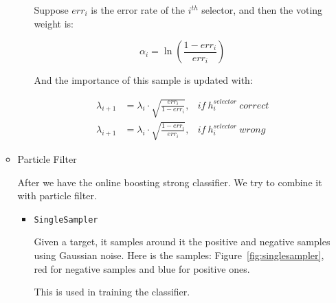 \documentclass[a4paper]{article}
\begin{document}
\begin{enumerate}
\begin{itemize}
\begin{itemize}
Suppose $err_i$ is the error rate of the $i^{th}$ selector, and then the voting weight is:

\begin{equation}
\alpha_i=\ln(\frac{1-err_i}{err_i})
\end{equation}

And the importance of this sample is updated with:

\begin{subequations}
\begin{align}
\lambda_{i+1}&=\lambda_i\cdot\sqrt{\frac{err_i}{1-err_i}}, &if~h^{selector}_{i}~correct\\
\lambda_{i+1}&=\lambda_i\cdot\sqrt{\frac{1-err_i}{err_i}}, &if~h^{selector}_{i}~wrong
\end{align}
\end{subequations}
\end{itemize}

\item Particle Filter

After we have the online boosting strong classifier. We try to combine it with particle filter.

\begin{itemize}

\item \lstinline{SingleSampler}

Given a target, it samples around it the positive and negative samples using Gaussian noise. Here is the samples: Figure~\ref{fig:singlesampler}, red for negative samples and blue for positive ones.

This is used in training the classifier.


\end{itemize}
\end{itemize}
\end{enumerate}
\end{document}
